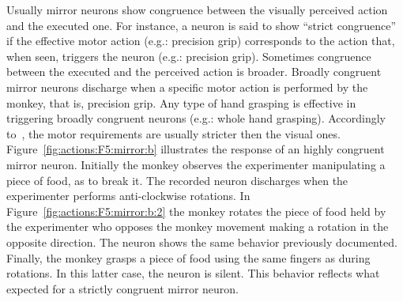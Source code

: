 Usually mirror neurons show congruence between the visually perceived action and
the executed one. 
For instance, a neuron is said to show ``strict congruence'' if the effective 
motor action (e.g.: precision grip) corresponds to the action that, when seen,
triggers the neuron (e.g.: precision grip).
Sometimes congruence between the executed and the perceived action is broader.
Broadly congruent mirror neurons discharge when a specific motor action is
performed by the monkey, that is, precision grip. 
Any type of hand grasping is effective in triggering broadly congruent neurons
(e.g.: whole hand grasping).
Accordingly to~\citet{rizzolatti.arbib:1998}, the motor requirements are usually
stricter then the visual ones.\\
Figure~\ref{fig:actions:F5:mirror:b} illustrates the response of an highly 
congruent mirror neuron. 
Initially the monkey observes the experimenter manipulating a piece of food, as
to break it. 
The recorded neuron discharges when the experimenter performs anti-clockwise
rotations.
In Figure~\ref{fig:actions:F5:mirror:b:2} the monkey rotates the piece of food
held by the experimenter who opposes the monkey movement making a rotation in
the opposite direction. The neuron shows the same behavior previously
documented.
Finally, the monkey grasps a piece of food using the same fingers as during
rotations. In this latter case, the neuron is silent.
This behavior reflects what expected for a strictly congruent mirror neuron.



%
